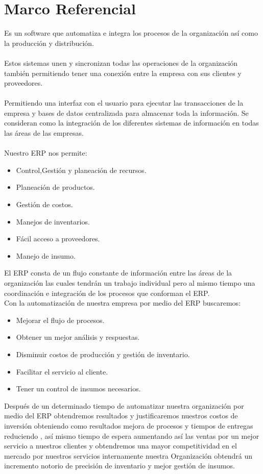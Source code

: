 \chapter{Marco Referencial}
%
Es un  software que   automatiza e integra  los procesos de la organizaci\'on  as\'i como la  producci\'on y distribuci\'on.
%
\\%
\\%
Estos sistemas  unen y sincronizan todas las operaciones de la organizaci\'on tambi\'en  permitiendo tener una conexi\'on entre la empresa  con sus clientes y proveedores.
\\%
\\%
Permitiendo una interfaz con el usuario para ejecutar las transacciones de la empresa y bases de datos centralizada para almacenar toda la informaci\'on. Se consideran como  la  integraci\'on de los diferentes sistemas de informaci\'on en todas las \'areas de las empresas.
\\%
\\%
Nuestro ERP nos permite:
\\%
\begin{itemize}
	\item Control,Gesti\'on y planeaci\'on de recursos.
	\item Planeaci\'on de productos.
	\item Gesti\'on de costos.
	\item Manejos de inventarios.
	\item F\'acil acceso a proveedores.
	\item Manejo de insumo.
\end{itemize}
%
El ERP consta de un flujo constante de informaci\'on entre las \'areas de la organizaci\'on las cuales tendr\'an un trabajo individual pero al mismo tiempo una coordinaci\'on e integraci\'on de los procesos que conforman el ERP.
\\%
Con la automatizaci\'on de nuestra empresa por medio del ERP buscaremos:
%
\begin{itemize}
	\item Mejorar el flujo de procesos. 
	\item	Obtener un mejor an\'alisis y respuestas.
	\item Disminuir costos de producci\'on y gesti\'on de inventario.
	\item Facilitar el servicio al cliente.
	\item Tener un control de insumos necesarios.
\end{itemize}
%
Despu\'es de un determinado tiempo de automatizar nuestra organizaci\'on por medio del ERP obtendremos resultados y justificaremos nuestros costos de inversi\'on obteniendo como resultados  mejora de procesos y tiempos de entregas reduciendo , as\'i mismo tiempo de espera  aumentando as\'i las ventas por un mejor servicio a nuestros clientes y obtendremos una mayor competitividad  en el mercado por nuestros servicios  internamente nuestra Organizaci\'on obtendr\'a un incremento notorio de precisi\'on de inventario y mejor gesti\'on de insumos.
